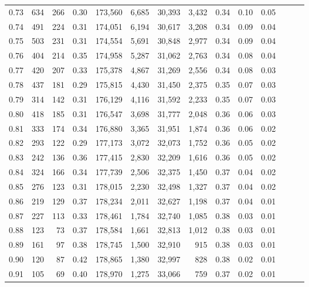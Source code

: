 \begin{tabular}{rrrrrrrrrrrrrr}
0.73 &    634 &  266 &  0.30 &  173,560 &    6,685 &  30,393 &   3,432 &  0.34 &  0.10 &      0.05 \\
0.74 &    491 &  224 &  0.31 &  174,051 &    6,194 &  30,617 &   3,208 &  0.34 &  0.09 &      0.04 \\
0.75 &    503 &  231 &  0.31 &  174,554 &    5,691 &  30,848 &   2,977 &  0.34 &  0.09 &      0.04 \\
0.76 &    404 &  214 &  0.35 &  174,958 &    5,287 &  31,062 &   2,763 &  0.34 &  0.08 &      0.04 \\
0.77 &    420 &  207 &  0.33 &  175,378 &    4,867 &  31,269 &   2,556 &  0.34 &  0.08 &      0.03 \\
0.78 &    437 &  181 &  0.29 &  175,815 &    4,430 &  31,450 &   2,375 &  0.35 &  0.07 &      0.03 \\
0.79 &    314 &  142 &  0.31 &  176,129 &    4,116 &  31,592 &   2,233 &  0.35 &  0.07 &      0.03 \\
0.80 &    418 &  185 &  0.31 &  176,547 &    3,698 &  31,777 &   2,048 &  0.36 &  0.06 &      0.03 \\
0.81 &    333 &  174 &  0.34 &  176,880 &    3,365 &  31,951 &   1,874 &  0.36 &  0.06 &      0.02 \\
0.82 &    293 &  122 &  0.29 &  177,173 &    3,072 &  32,073 &   1,752 &  0.36 &  0.05 &      0.02 \\
0.83 &    242 &  136 &  0.36 &  177,415 &    2,830 &  32,209 &   1,616 &  0.36 &  0.05 &      0.02 \\
0.84 &    324 &  166 &  0.34 &  177,739 &    2,506 &  32,375 &   1,450 &  0.37 &  0.04 &      0.02 \\
0.85 &    276 &  123 &  0.31 &  178,015 &    2,230 &  32,498 &   1,327 &  0.37 &  0.04 &      0.02 \\
0.86 &    219 &  129 &  0.37 &  178,234 &    2,011 &  32,627 &   1,198 &  0.37 &  0.04 &      0.01 \\
0.87 &    227 &  113 &  0.33 &  178,461 &    1,784 &  32,740 &   1,085 &  0.38 &  0.03 &      0.01 \\
0.88 &    123 &   73 &  0.37 &  178,584 &    1,661 &  32,813 &   1,012 &  0.38 &  0.03 &      0.01 \\
0.89 &    161 &   97 &  0.38 &  178,745 &    1,500 &  32,910 &     915 &  0.38 &  0.03 &      0.01 \\
0.90 &    120 &   87 &  0.42 &  178,865 &    1,380 &  32,997 &     828 &  0.38 &  0.02 &      0.01 \\
0.91 &    105 &   69 &  0.40 &  178,970 &    1,275 &  33,066 &     759 &  0.37 &  0.02 &      0.01 \\

\end{tabular}
